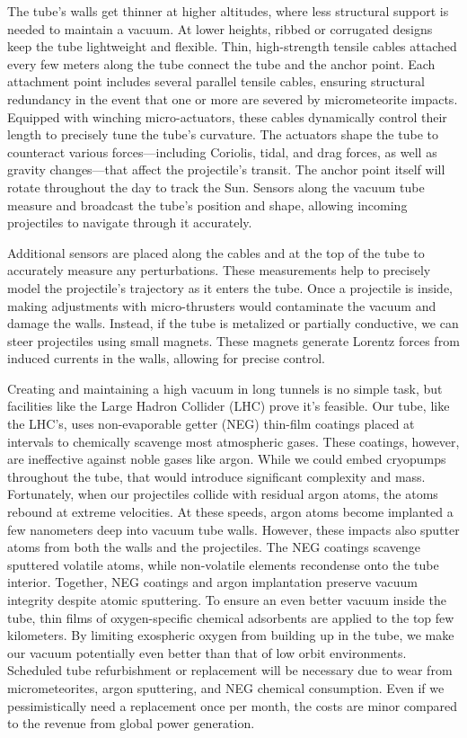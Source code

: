 \documentclass{article}
\begin{document}
The tube's walls get thinner at higher altitudes, where less structural support is needed to maintain a vacuum.  At lower heights, ribbed or corrugated designs  keep the tube lightweight and flexible. Thin, high-strength tensile cables attached every few meters along the tube connect the tube and the anchor point.  Each attachment point includes several parallel tensile cables, ensuring structural redundancy in the event that one or more are severed by micrometeorite impacts.   Equipped with winching micro-actuators, these cables dynamically control their length to precisely tune the tube's curvature. The actuators shape the tube to counteract various forces---including Coriolis, tidal, and drag forces, as well as gravity changes---that affect the projectile's transit. The anchor point itself will rotate throughout the day to track the Sun.  Sensors along the vacuum tube measure and broadcast the tube's position and shape, allowing incoming projectiles to navigate through it accurately.

Additional sensors are placed along the cables and at the top of the tube to accurately measure any perturbations. These measurements help to precisely model the projectile's trajectory as it enters the tube. Once a projectile is inside, making adjustments with micro-thrusters would contaminate the vacuum and damage the walls. Instead, if the tube is metalized or partially conductive, we can steer projectiles using small magnets. These magnets generate Lorentz forces from induced currents in the walls, allowing for precise control.

Creating and maintaining a high vacuum in long tunnels is no simple task, but facilities like the Large Hadron Collider (LHC) prove it's feasible. Our tube, like the LHC's, uses non-evaporable getter (NEG) \cite{neg_coatings} thin-film coatings placed at intervals to chemically scavenge most atmospheric gases. These coatings, however, are ineffective against noble gases like argon. While we could embed cryopumps throughout the tube, that would introduce significant complexity and mass. Fortunately, when our projectiles collide with residual argon atoms, the atoms rebound at extreme velocities.  At these speeds, argon atoms become implanted a few nanometers deep into vacuum tube walls.  However, these impacts also sputter atoms from both the walls and the projectiles. The NEG coatings scavenge sputtered volatile atoms, while non-volatile elements recondense onto the tube interior.  Together, NEG coatings and argon implantation preserve vacuum integrity despite atomic sputtering. To ensure an even better vacuum inside the tube, thin films of oxygen-specific chemical adsorbents  are applied to the top few kilometers. By limiting exospheric oxygen from building up in the tube, we make our vacuum potentially even better than that of low orbit environments.  Scheduled tube refurbishment or replacement will be necessary due to wear from micrometeorites, argon sputtering, and NEG chemical consumption. Even if we pessimistically need a replacement once per month, the costs are minor compared to the revenue from global power generation.
\end{document}
